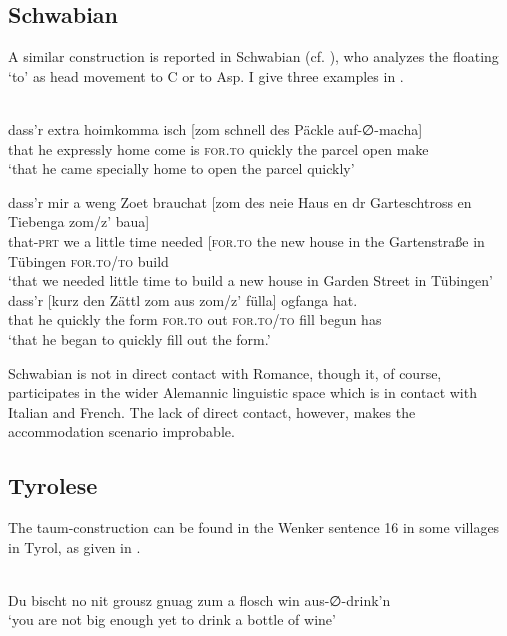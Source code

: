 \documentclass[output=paper,hidelinks,draftmode]{langscibook}
\begin{document}
\subsection{Schwabian}

A similar construction is reported in Schwabian (cf. \citealt[23]{Hoekstra1997}), who analyzes the floating `to' as head movement to C or to Asp. I give three examples in .


\ea\label{ex:postma:12}  \\
\ea\label{ex:postma:12a} \gll dass'r extra hoimkomma isch [zom schnell des Päckle auf-∅-macha]\\
     {that he} expressly {home come} is \textsc{for.to} quickly the parcel {open make}\\
\glt `that he came specially home to open the parcel quickly'

\ex\label{ex:postma:12b} \gll dass'r mir a weng Zoet brauchat [zom des neie Haus en dr Garteschtross en Tiebenga zom/z' baua]\\
     that-\textsc{prt} we a little time needed [\textsc{for.to} the new house in the Gartenstraße in Tübingen \textsc{for.to/to} build\\
\glt `that we needed little time to build a new house in Garden Street in Tübingen'
\ex\label{ex:postma:12c} \gll dass'r [kurz den Zättl zom aus zom/z' fülla] ogfanga hat.\\
     {that he} quickly the form \textsc{for.to} out \textsc{for.to}/\textsc{to} fill begun has\\
\glt `that he began to quickly fill out the form.'\z\z

Schwabian is not in direct contact with Romance, though it, of course, participates in the wider Alemannic linguistic space which is in contact with Italian and French. The lack of direct contact, however, makes the accommodation scenario improbable. 

\subsection{Tyrolese}

The taum-construction can be found in the Wenker sentence 16 in some villages in Tyrol, as given in .


\ea\label{ex:postma:13} \\
 Du bischt no nit grousz gnuag zum a flosch win aus-∅-drink'n\\
`you are not big enough yet to drink a bottle of wine'\z
\end{document}
